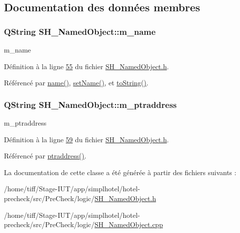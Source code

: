 \subsection{Documentation des données membres}
\hypertarget{classSH__NamedObject_a7f8e3346256986c337a792339ea5a015}{
\subsubsection[{m\-\_\-name}]{\setlength{\rightskip}{0pt plus 5cm}Q\-String S\-H\-\_\-\-Named\-Object\-::m\-\_\-name\hspace{0.3cm}{\ttfamily [private]}}}\label{classSH__NamedObject_a7f8e3346256986c337a792339ea5a015}


m\-\_\-name 



Définition à la ligne \hyperlink{SH__NamedObject_8h_source_l00055}{55} du fichier \hyperlink{SH__NamedObject_8h_source}{S\-H\-\_\-\-Named\-Object.\-h}.



Référencé par \hyperlink{classSH__NamedObject_a970f265df31b28b2179bbbceb6170ac2}{name()}, \hyperlink{classSH__NamedObject_a18e1860b747e029eefa140f8324bb503}{set\-Name()}, et \hyperlink{classSH__NamedObject_af73e97f6476ca1ef3a22b159d179f5e7}{to\-String()}.

\hypertarget{classSH__NamedObject_acfc489299f90750082785bf9ac42f4ff}{
\subsubsection[{m\-\_\-ptraddress}]{\setlength{\rightskip}{0pt plus 5cm}Q\-String S\-H\-\_\-\-Named\-Object\-::m\-\_\-ptraddress\hspace{0.3cm}{\ttfamily [private]}}}\label{classSH__NamedObject_acfc489299f90750082785bf9ac42f4ff}


m\-\_\-ptraddress 



Définition à la ligne \hyperlink{SH__NamedObject_8h_source_l00059}{59} du fichier \hyperlink{SH__NamedObject_8h_source}{S\-H\-\_\-\-Named\-Object.\-h}.



Référencé par \hyperlink{classSH__NamedObject_a98806c492b55a54d01330bbecce5118b}{ptraddress()}.



La documentation de cette classe a été générée à partir des fichiers suivants \-:\begin{DoxyCompactItemize}
\item 
/home/tiff/\-Stage-\/\-I\-U\-T/app/simplhotel/hotel-\/precheck/src/\-Pre\-Check/logic/\hyperlink{SH__NamedObject_8h}{S\-H\-\_\-\-Named\-Object.\-h}\item 
/home/tiff/\-Stage-\/\-I\-U\-T/app/simplhotel/hotel-\/precheck/src/\-Pre\-Check/logic/\hyperlink{SH__NamedObject_8cpp}{S\-H\-\_\-\-Named\-Object.\-cpp}\end{DoxyCompactItemize}
